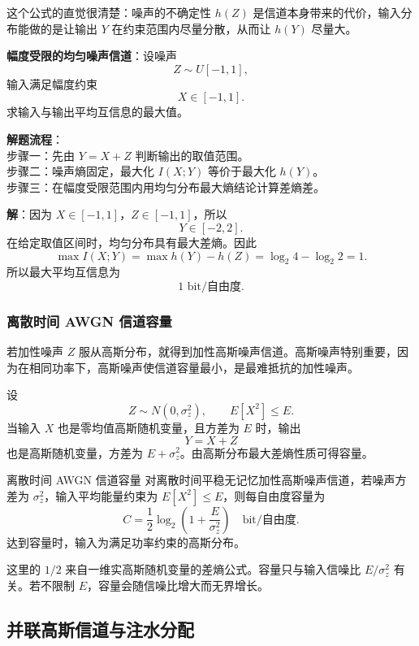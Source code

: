 这个公式的直觉很清楚：噪声的不确定性 $h(Z)$ 是信道本身带来的代价，输入分布能做的是让输出 $Y$ 在约束范围内尽量分散，从而让 $h(Y)$ 尽量大。

\begin{example}
\label{ex:ch8-amplitude-limited-uniform-noise}
\textbf{幅度受限的均匀噪声信道}：设噪声
\[
Z\sim U[-1,1],
\]
输入满足幅度约束
\[
X\in[-1,1].
\]
求输入与输出平均互信息的最大值。

\noindent \textbf{解题流程}：\\[2pt]
步骤一：先由 $Y=X+Z$ 判断输出的取值范围。\\
步骤二：噪声熵固定，最大化 $I(X;Y)$ 等价于最大化 $h(Y)$。\\
步骤三：在幅度受限范围内用均匀分布最大熵结论计算差熵差。

\textbf{解}：因为 $X\in[-1,1]$，$Z\in[-1,1]$，所以
\[
Y\in[-2,2].
\]
在给定取值区间时，均匀分布具有最大差熵。因此
\[
\max I(X;Y)=\max h(Y)-h(Z)
=\log_2 4-\log_2 2=1.
\]
所以最大平均互信息为
\[
1\text{ bit/自由度}.
\]
\end{example}

\subsubsection{离散时间 AWGN 信道容量}

若加性噪声 $Z$ 服从高斯分布，就得到加性高斯噪声信道。高斯噪声特别重要，因为在相同功率下，高斯噪声使信道容量最小，是最难抵抗的加性噪声。

设
\[
Z\sim N(0,\sigma_z^2),
\qquad
E[X^2]\le E.
\]
当输入 $X$ 也是零均值高斯随机变量，且方差为 $E$ 时，输出
\[
Y=X+Z
\]
也是高斯随机变量，方差为 $E+\sigma_z^2$。由高斯分布最大差熵性质可得容量。

\begin{formulaBox}{离散时间 AWGN 信道容量}
对离散时间平稳无记忆加性高斯噪声信道，若噪声方差为 $\sigma_z^2$，输入平均能量约束为 $E[X^2]\le E$，则每自由度容量为
\[
C=\frac12\log_2\left(1+\frac{E}{\sigma_z^2}\right)
\quad\text{bit/自由度}.
\]
达到容量时，输入为满足功率约束的高斯分布。
\end{formulaBox}

这里的 $1/2$ 来自一维实高斯随机变量的差熵公式。容量只与输入信噪比 $E/\sigma_z^2$ 有关。若不限制 $E$，容量会随信噪比增大而无界增长。

\subsection{并联高斯信道与注水分配}

